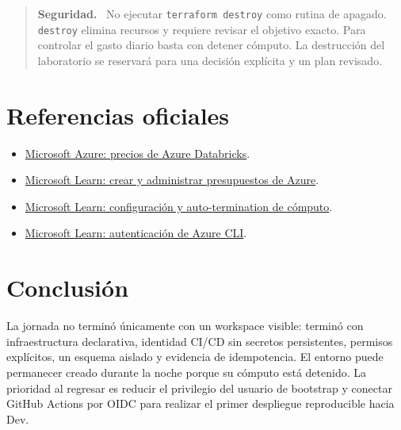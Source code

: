 \documentclass[11pt,a4paper]{article}
\newenvironment{seguridad}{
  \begin{quote}\color{dborange}\textbf{Seguridad.}\ }{
  \end{quote}}
\begin{document}
\begin{seguridad}
No ejecutar \texttt{terraform destroy} como rutina de apagado. \texttt{destroy} elimina recursos y
requiere revisar el objetivo exacto. Para controlar el gasto diario basta con detener cómputo. La
destrucción del laboratorio se reservará para una decisión explícita y un plan revisado.
\end{seguridad}

\section{Referencias oficiales}

\begin{itemize}
  \item \href{https://azure.microsoft.com/pricing/details/databricks/}%
  {Microsoft Azure: precios de Azure Databricks}.
  \item \href{https://learn.microsoft.com/azure/cost-management-billing/costs/tutorial-acm-create-budgets}%
  {Microsoft Learn: crear y administrar presupuestos de Azure}.
  \item \href{https://learn.microsoft.com/azure/databricks/compute/configure}%
  {Microsoft Learn: configuración y auto-termination de cómputo}.
  \item \href{https://learn.microsoft.com/cli/azure/authenticate-azure-cli}%
  {Microsoft Learn: autenticación de Azure CLI}.
\end{itemize}

\section*{Conclusión}

La jornada no terminó únicamente con un workspace visible: terminó con infraestructura declarativa,
identidad CI/CD sin secretos persistentes, permisos explícitos, un esquema aislado y evidencia de
idempotencia. El entorno puede permanecer creado durante la noche porque su cómputo está detenido.
La prioridad al regresar es reducir el privilegio del usuario de bootstrap y conectar GitHub Actions
por OIDC para realizar el primer despliegue reproducible hacia Dev.
\end{document}
